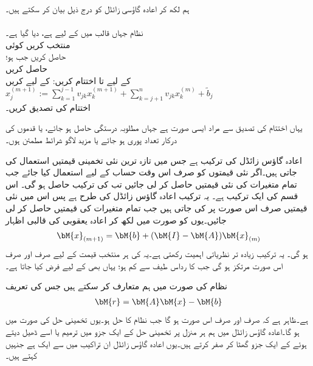 ہم  لکھ کر اعادہ گاؤسی زائڈل کو درج ذیل بیان کر سکتے ہیں۔\\

\noindent\makebox[\linewidth]{\rule{\textwidth}{0.4pt}}
\\
نظام  جہاں  قالب  میں  کے لیے  ہے، دیا گیا ہے۔\\
منتخب کریں کوئی \\
حاصل کریں  جب  ہو؛ \\
حاصل کریں \\
 کے لیے  تا اختتام کریں:
 کے لیے کریں\\
$x_j^{(m+1)}:=\sum\limits_{k=1}^{j-1}v_{jk}x_k^{(m+1)}+\sum\limits_{k=j+1}^{n}v_{jk}x_k^{(m)}+\tilde{b}_j$\\
اختتام کی تصدیق کریں۔\\
\noindent\makebox[\linewidth]{\rule{\textwidth}{0.4pt}}

یہاں اختتام کی تصدیق سے مراد ایسی صورت ہے جہاں مطلوبہ درستگی حاصل ہو جائے، یا قدموں کی درکار تعداد پوری ہو جائے یا مزید لاگو شرائط مطمئن ہوں۔

اعادہ گاؤس زائڈل  کی ترکیب ہے جس میں تازہ ترین نئی تخمینی قیمتیں استعمال کی جاتی ہیں۔اگر  نئی قیمتوں کو صرف اس وقت حساب کے لیے استعمال کیا جائے جب تمام متغیرات کی نئی قیمتیں حاصل کر لی جائیں تب  کی ترکیب حاصل ہو گی۔ اس قسم کی ایک ترکیب ہے۔ یہ ترکیب اعادہ گاؤس زائڈل کی طرح ہے پس اس میں نئی قیمتیں صرف اس صورت پر کی جاتی ہیں جب تمام متغیرات کی قیمتیں حاصل کر لی جائیں۔یوں  کو  صورت میں لکھ کر اعادہ یعقوبی کی قالبی اظہار
\begin{align}\label{مساوات_خطی_اعدادی_مثال_ث}
\bM{x}_{(m+1)}=\bM{b}+(\bM{I}-\bM{A})\bM{x}_{(m)}
\end{align}
ہو گی۔ یہ ترکیب زیادہ تر نظریاتی اہمیت رکھتی ہے۔یہ  کی ہر منتخب قیمت کے لیے صرف اور صرف اس صورت مرتکز ہو گی جب    کا رداس طیف  سے کم ہو؛ یہاں بھی  کے لیے  فرض کیا جاتا ہے۔

نظام  کی صورت میں ہم    متعارف کر سکتے ہیں جس کی تعریف
\begin{align*}
\bM{r}=\bM{A}\bM{x}-\bM{b}
\end{align*}
ہے۔ظاہر ہے کہ  صرف اور صرف اس صورت ہو گا جب  نظام کا حل ہو۔یوں تخمینی حل کی صورت میں  ہو گا۔اعادہ گاؤس زائڈل میں ہم ہر منزل پر تخمینی حل کے ایک جزو میں ترمیم یا اسے ڈھیل دیتے ہوئے  کے ایک جزو  گھٹا کر صفر کرتے ہیں۔یوں اعادہ گاؤس زائڈل ان تراکیب میں سے ایک ہے جنہیں  کہتے ہیں۔ 

